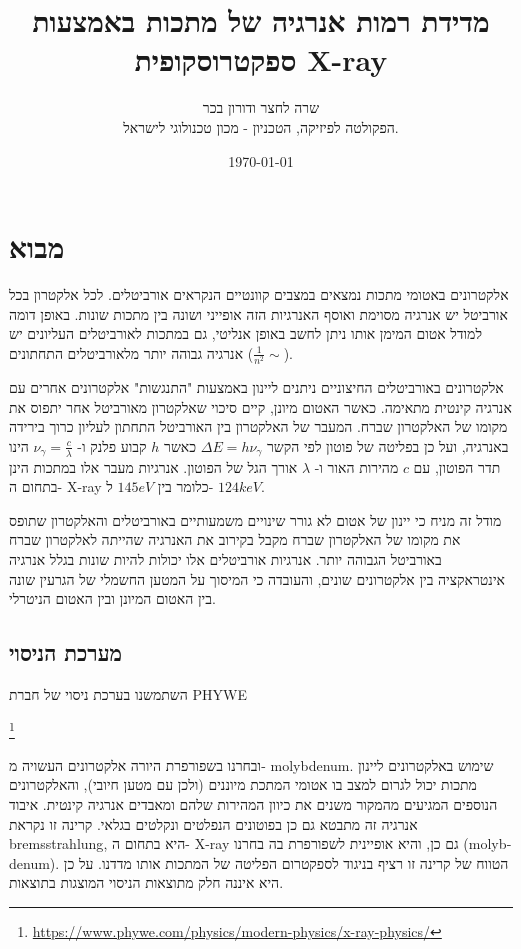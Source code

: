 \documentclass{article}
\title{
	מדידת רמות אנרגיה של מתכות באמצעות ספקטרוסקופית
	\textenglish{X-ray}
}
\author{
שרה לחצר ודורון בכר \\
הפקולטה לפיזיקה, הטכניון - מכון טכנולוגי לישראל.
}
\date{\today}
\begin{document}
\maketitle

\begin{abstract}
\end{abstract}
\section{מבוא}

אלקטרונים באטומי מתכות נמצאים במצבים קוונטיים הנקראים אורביטלים. לכל אלקטרון בכל אורביטל יש אנרגיה מסוימת ואוסף האנרגיות הזה אופייני ושונה בין מתכות שונות. באופן דומה למודל אטום המימן אותו ניתן לחשב באופן אנליטי, גם במתכות לאורביטלים העליונים יש אנרגיה גבוהה יותר מלאורביטלים התחתונים
($\frac{1}{n^2}\sim$).

אלקטרונים באורביטלים החיצוניים ניתנים ליינון באמצעות
"התנגשות"
אלקטרונים אחרים עם אנרגיה קינטית מתאימה. כאשר האטום מיונן, קיים סיכוי שאלקטרון מאורביטל אחר יתפוס את מקומו של האלקטרון שברח. המעבר של האלקטרון בין האורביטל התחתון לעליון כרוך בירידה באנרגיה, ועל כן בפליטה של פוטון לפי הקשר
$\Delta E = h \nu_{\gamma}$
כאשר
$h$
קבוע פלנק
ו-
$\nu_{\gamma} = \frac{c}{\lambda}$
הינו תדר הפוטון, עם
$c$
מהירות האור ו-
$\lambda$
אורך הגל של הפוטון. אנרגיות מעבר אלו במתכות הינן בתחום ה-
\textenglish{X-ray}
כלומר בין
$145 eV$
ל-
$124 keV$.

מודל זה מניח כי יינון של אטום לא גורר שינויים משמעותיים באורביטלים והאלקטרון שתופס את מקומו של האלקטרון שברח מקבל בקירוב את האנרגיה שהייתה לאלקטרון שברח באורביטל הגבוהה יותר. אנרגיות אורביטלים אלו יכולות להיות שונות בגלל אנרגיה אינטראקציה בין אלקטרונים שונים, והעובדה כי המיסוך על המטען החשמלי של הגרעין שונה בין האטום המיונן ובין האטום הניטרלי.

\subsection{מערכת הניסוי}

השתמשנו בערכת ניסוי של חברת
\textenglish{PHYWE}\begin{english}\footnote{\url{https://www.phywe.com/physics/modern-physics/x-ray-physics/}}\end{english}
ובחרנו בשפורפרת היורה אלקטרונים העשויה מ-
\textenglish{molybdenum}. שימוש באלקטרונים ליינון מתכות יכול לגרום למצב בו אטומי המתכת מיוננים (ולכן עם מטען חיובי), והאלקטרונים הנוספים המגיעים מהמקור משנים את כיוון המהירות שלהם ומאבדים אנרגיה קינטית. איבוד אנרגיה זה מתבטא גם כן בפוטונים הנפלטים ונקלטים בגלאי. קרינה זו נקראת
\textenglish{bremsstrahlung},
היא בתחום ה-
\textenglish{X-ray}
גם כן,
והיא אופיינית לשפורפרת בה בחרנו
(\textenglish{molybdenum}).
הטווח של קרינה זו רציף בניגוד לספקטרום הפליטה של המתכות אותו מדדנו. על כן היא איננה חלק מתוצאות הניסוי המוצגות בתוצאות.
\end{document}
